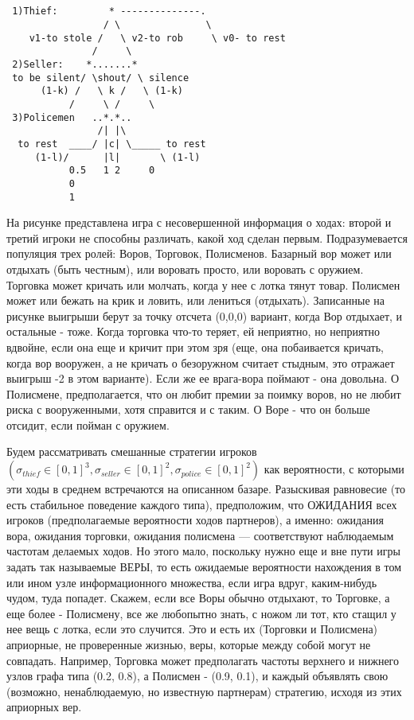 \documentclass[a4paper,12pt]{article}
\begin{document}
\begin{exmp}\rm

\begin{verbatim}


 1)Thief:         * --------------.
                 / \               \
    v1-to stole /   \ v2-to rob     \ v0- to rest
               /     \
 2)Seller:    *.......*
 to be silent/ \shout/ \ silence
      (1-k) /   \ k /   \ (1-k)
           /     \ /     \
 3)Policemen   ..*.*..
                /| |\
  to rest  ____/ |c| \_____ to rest
     (1-l)/      |l|       \ (1-l)
           0.5   1 2     0
           0
           1

\end{verbatim}

%
На 
рисунке представлена игра с несовершенной
информация о ходах: второй и третий игроки не способны
различать, какой ход сделан первым. Подразумевается
популяция трех ролей: Воров, Торговок, Полисменов. Базарный
вор может или отдыхать (быть честным), или воровать просто,
или воровать с оружием. Торговка может кричать или молчать,
когда у нее с лотка тянут товар. Полисмен может или бежать
на крик и ловить, или лениться (отдыхать). Записанные на
рисунке выигрыши берут за точку отсчета (0,0,0) вариант,
когда Вор отдыхает, и остальные - тоже. Когда торговка
что-то теряет, ей неприятно, но неприятно вдвойне, если она
еще и кричит при этом зря  (еще, она побаивается кричать,
когда вор вооружен, а не кричать о безоружном считает
стыдным, это отражает выигрыш -2 в этом варианте). Если же
ее врага-вора поймают - она довольна. О Полисмене,
предполагается, что он любит премии за поимку воров, но не
любит риска с вооруженными, хотя справится и с таким. О
Воре - что он больше отсидит, если пойман с оружием.

\rm Будем рассматривать смешанные стратегии игроков
$(\sigma_{thief}\in [0,1]^3, \sigma_{seller}\in
[0,1]^2,\sigma_{police}\in [0,1]^2)$ как вероятности, с
которыми эти ходы в среднем встречаются на описанном
базаре. Разыскивая равновесие (то есть стабильное поведение
каждого типа), предположим, что ОЖИДАНИЯ всех игроков
(предполагаемые вероятности ходов партнеров), а именно:
ожидания вора,
ожидания торговки, ожидания полисмена
--- соответствуют наблюдаемым частотам делаемых ходов. Но
этого мало, поскольку нужно еще и вне пути игры задать так
называемые ВЕРЫ, то есть ожидаемые вероятности нахождения в
том или ином узле информационного множества, если игра
вдруг, каким-нибудь чудом, туда попадет. Скажем, если все
Воры обычно отдыхают, то Торговке, а еще более - Полисмену,
все же любопытно знать, с ножом ли тот, кто стащил у нее
вещь с лотка, если это случится. Это и есть их (Торговки и
Полисмена) априорные, не проверенные жизнью, веры, которые
между собой могут не совпадать. Например, Торговка может
предполагать частоты верхнего и нижнего узлов графа типа
(0.2, 0.8), а Полисмен - (0.9, 0.1), и каждый объявлять
свою (возможно, ненаблюдаемую, но известную партнерам)
стратегию, исходя из этих априорных вер.



\end{exmp}
\end{document}
